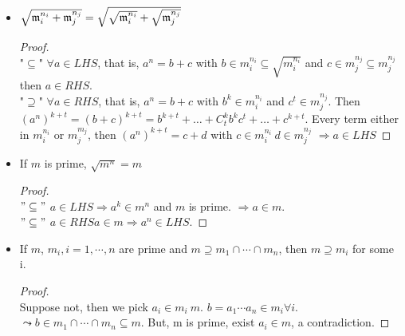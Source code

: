 \begin{prop} \leavevmode \label{prop:radical-power-relation} 
  \begin{itemize}
    \item  $\sqrt{\mathfrak{m}_i^{n_i} + \mathfrak{m}_j^{n_j}} = \sqrt{\sqrt{\mathfrak{m}_i^{n_i}} + 
      \sqrt{\mathfrak{m}_j^{n_j}}}$
      \begin{proof} $ $\\ 
        "$\subseteq$" $\forall a \in LHS$, that is, $a^n  = b + c$ with 
        $b \in m_i^{n_i} \subseteq \sqrt{m_i^{n_i}}$ and 
        $c \in m_j^{n_j} \subseteq{m_j^{n_j}}$ then $a \in RHS$. \\
        "$\supseteq$" $\forall a \in RHS$, that is, $a^n = b + c$ with 
        $b^k \in m_i^{n_i}$ and $c^t \in m_j^{n_j}$. Then 
        $(a^n)^{k+t} = (b + c)^{k + t} = b^{k+t} + \dots + C_{t}^{k}b^kc^t
        + \dots + c^{k+t}$. Every term either in $m_i^{n_i}$ or $m_j^{m_j}$,
         then $(a^n)^{k+t} = c + d$ with $c \in m_i^{n_i}\ d \in m_j^{n_j}$
         $\Rightarrow a \in LHS$
      \end{proof}
    \item If $m$ is prime, $\sqrt{m^{n}} = m$
      \begin{proof} $ $\\
        $"\subseteq"$ $a \in LHS \Rightarrow a^k \in m^{n}$ and $m$ is prime.
        $\Rightarrow a \in m$. \\
        $"\subseteq"$ $a \in RHS a \in m \Rightarrow a^n \in LHS$.
      \end{proof}
     \item If $m$, $m_i, i = 1, \cdots, n$ are prime and $m \supseteq m_1 \cap
       \cdots \cap m_n$, then $m \supseteq m_i$ for some i.
       \begin{proof} $ $\\
         Suppose not, then we pick $a_i \in m_i \ m$. $b = a_1\cdots a_n \in m_i 
         \forall i$. $\leadsto b \in m_1 \cap \cdots \cap m_n \subseteq m$. But,
         m is prime, exist $a_i \in m$, a contradiction. 
       \end{proof}
  \end{itemize}
\end{prop}


